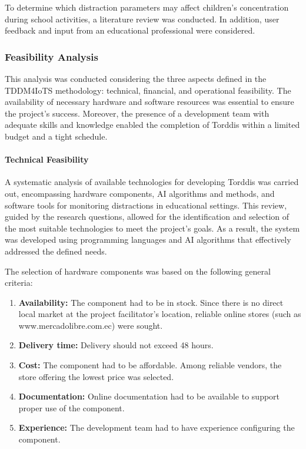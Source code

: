                 To determine which distraction parameters may affect children’s concentration during school activities, a literature review was conducted. In addition, user feedback and input from an educational professional were considered.
                
                \subsubsection{Feasibility Analysis}
                This analysis was conducted considering the three aspects defined in the TDDM4IoTS methodology: technical, financial, and operational feasibility. The availability of necessary hardware and software resources was essential to ensure the project's success. Moreover, the presence of a development team with adequate skills and knowledge enabled the completion of Torddis within a limited budget and a tight schedule.
                
                \paragraph{Technical Feasibility}
                A systematic analysis of available technologies for developing Torddis was carried out, encompassing hardware components, AI algorithms and methods, and software tools for monitoring distractions in educational settings. This review, guided by the research questions, allowed for the identification and selection of the most suitable technologies to meet the project’s goals. As a result, the system was developed using programming languages and AI algorithms that effectively addressed the defined needs.
                
                The selection of hardware components was based on the following general criteria:
                
                \begin{enumerate}
                    \item \textbf{Availability:} The component had to be in stock. Since there is no direct local market at the project facilitator’s location, reliable online stores (such as www.mercadolibre.com.ec) were sought.
                    
                    \item \textbf{Delivery time:} Delivery should not exceed 48 hours.
                    
                    \item \textbf{Cost:} The component had to be affordable. Among reliable vendors, the store offering the lowest price was selected.
                    
                    \item \textbf{Documentation:} Online documentation had to be available to support proper use of the component.
                    
                    \item \textbf{Experience:} The development team had to have experience configuring the component.
                \end{enumerate}
                
